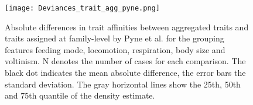 \documentclass[../Draft_harmonization_paper.tex]{subfiles}
\begin{document}
\begin{figure}[H]
  \centering
  \texttt{[image: Deviances\_trait\_agg\_pyne.png]}
  \caption{Absolute differences in trait affinities between aggregated traits and traits assigned at family-level by Pyne et al. for the grouping features feeding mode, locomotion, respiration, body size and voltinism. N denotes the number of cases for each comparison. The black dot indicates the mean absolute difference, the error bars the standard deviation. The gray horizontal lines show the 25th, 50th and 75th quantile of the density estimate.}
  \label{fig:diff_aggr_traits_pyne}
\end{figure}

\end{document}
